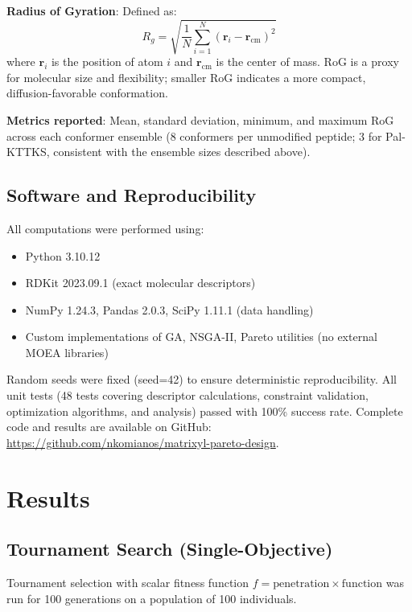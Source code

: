 \documentclass[11pt,letterpaper]{article}
\begin{document}
\textbf{Radius of Gyration}: Defined as:
\begin{equation}
R_g = \sqrt{\frac{1}{N} \sum_{i=1}^{N} (\mathbf{r}_i - \mathbf{r}_{\text{cm}})^2}
\label{eq:rog}
\end{equation}
where $\mathbf{r}_i$ is the position of atom $i$ and $\mathbf{r}_{\text{cm}}$ is the center of mass. RoG is a proxy for molecular size and flexibility; smaller RoG indicates a more compact, diffusion-favorable conformation.

\textbf{Metrics reported}: Mean, standard deviation, minimum, and maximum RoG across each conformer ensemble (8 conformers per unmodified peptide; 3 for Pal-KTTKS, consistent with the ensemble sizes described above).

\subsection{Software and Reproducibility}

All computations were performed using:
\begin{itemize}
  \item Python 3.10.12
  \item RDKit 2023.09.1 (exact molecular descriptors)
  \item NumPy 1.24.3, Pandas 2.0.3, SciPy 1.11.1 (data handling)
  \item Custom implementations of GA, NSGA-II, Pareto utilities (no external MOEA libraries)
\end{itemize}

Random seeds were fixed (seed=42) to ensure deterministic reproducibility. All unit tests (48 tests covering descriptor calculations, constraint validation, optimization algorithms, and analysis) passed with 100\% success rate. Complete code and results are available on GitHub: \url{https://github.com/nkomianos/matrixyl-pareto-design}.

\section{Results}

\subsection{Tournament Search (Single-Objective)}

Tournament selection with scalar fitness function $f = \text{penetration} \times \text{function}$ was run for 100 generations on a population of 100 individuals.
\end{document}
